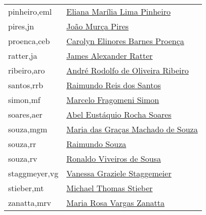 \begin{longtable}{l l}
pinheiro,eml        & \href{http://lattes.cnpq.br/7238835279276067}{Eliana Marília Lima Pinheiro} \\
pires,jn            & \href{https://plants.jstor.org/stable/10.5555/al.ap.person.bm000006559}{João Murça Pires} \\                     
proenca,ceb         & \href{http://lattes.cnpq.br/8243382046974477}{Carolyn Elinores Barnes Proença} \\
ratter,ja           & \href{https://plants.jstor.org/stable/10.5555/al.ap.person.bm000023562}{James Alexander Ratter} \\               
ribeiro,aro         & \href{http://lattes.cnpq.br/6319309184129826}{André Rodolfo de Oliveira Ribeiro} \\
santos,rrb          & \href{https://plants.jstor.org/stable/10.5555/al.ap.person.bm000032907}{Raimundo Reis dos Santos} \\             
simon,mf            & \href{http://lattes.cnpq.br/8588589377152882}{Marcelo Fragomeni Simon} \\
soares,aer          & \href{http://lattes.cnpq.br/4908757546415140}{Abel Eustáquio Rocha Soares} \\
souza,mgm           & \href{http://lattes.cnpq.br/2817470874123772}{Maria das Graças Machado de Souza} \\
souza,rr            & \href{https://plants.jstor.org/stable/10.5555/al.ap.person.bm000055998 }{Raimundo Souza} \\                      
souza,rv            & \href{http://lattes.cnpq.br/2008471425847512}{Ronaldo Viveiros de Sousa} \\
staggmeyer,vg       & \href{http://lattes.cnpq.br/4357034543526737}{Vanessa Graziele Staggemeier} \\
stieber,mt          & \href{https://plants.jstor.org/stable/10.5555/al.ap.person.bm000010969}{Michael Thomas Stieber} \\               
zanatta,mrv         & \href{http://lattes.cnpq.br/5981278331253704}{Maria Rosa Vargas Zanatta} \\
      \hline
\end{longtable}